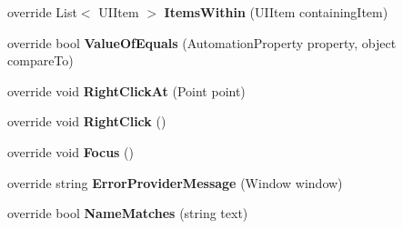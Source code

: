 \begin{DoxyCompactItemize}
\item 
\hypertarget{class_proto_test_1_1_golem_1_1_white_1_1_elements_1_1_white_window_a5b2e4355e52c3b4232e01d8dbc0cbc2c}{override List$<$ U\-I\-Item $>$ {\bfseries Items\-Within} (U\-I\-Item containing\-Item)}\label{class_proto_test_1_1_golem_1_1_white_1_1_elements_1_1_white_window_a5b2e4355e52c3b4232e01d8dbc0cbc2c}

\item 
\hypertarget{class_proto_test_1_1_golem_1_1_white_1_1_elements_1_1_white_window_a05c8023f2331cb2ba51c873e9bd26709}{override bool {\bfseries Value\-Of\-Equals} (Automation\-Property property, object compare\-To)}\label{class_proto_test_1_1_golem_1_1_white_1_1_elements_1_1_white_window_a05c8023f2331cb2ba51c873e9bd26709}

\item 
\hypertarget{class_proto_test_1_1_golem_1_1_white_1_1_elements_1_1_white_window_ac5045bba537b2b4b94b70db1e9cd216c}{override void {\bfseries Right\-Click\-At} (Point point)}\label{class_proto_test_1_1_golem_1_1_white_1_1_elements_1_1_white_window_ac5045bba537b2b4b94b70db1e9cd216c}

\item 
\hypertarget{class_proto_test_1_1_golem_1_1_white_1_1_elements_1_1_white_window_a6625722f7f430ad0171ebdf695047d1a}{override void {\bfseries Right\-Click} ()}\label{class_proto_test_1_1_golem_1_1_white_1_1_elements_1_1_white_window_a6625722f7f430ad0171ebdf695047d1a}

\item 
\hypertarget{class_proto_test_1_1_golem_1_1_white_1_1_elements_1_1_white_window_a7086423dcbf5895cb096d55f2647076e}{override void {\bfseries Focus} ()}\label{class_proto_test_1_1_golem_1_1_white_1_1_elements_1_1_white_window_a7086423dcbf5895cb096d55f2647076e}

\item 
\hypertarget{class_proto_test_1_1_golem_1_1_white_1_1_elements_1_1_white_window_a89f5e5ddadacb2b438b55926d4c97a8e}{override string {\bfseries Error\-Provider\-Message} (Window window)}\label{class_proto_test_1_1_golem_1_1_white_1_1_elements_1_1_white_window_a89f5e5ddadacb2b438b55926d4c97a8e}

\item 
\hypertarget{class_proto_test_1_1_golem_1_1_white_1_1_elements_1_1_white_window_a2a052b96a0217b64e7d0d4493def9444}{override bool {\bfseries Name\-Matches} (string text)}\label{class_proto_test_1_1_golem_1_1_white_1_1_elements_1_1_white_window_a2a052b96a0217b64e7d0d4493def9444}


\end{DoxyCompactItemize}
